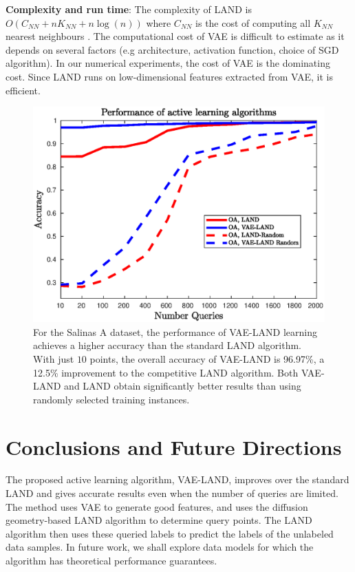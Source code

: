 \documentclass{article}
\begin{document}
\noindent \textbf{Complexity and run time}: The complexity of LAND is $O(C_{NN}+nK_{NN}+n\log(n))$ where $C_{NN}$ is the cost of computing all $K_{NN}$ nearest neighbours \cite{Maggioni2019_LAND}. 
The computational cost of VAE is difficult to estimate as it depends on several factors (e.g architecture, activation function, choice of SGD algorithm). In our numerical experiments, the cost of VAE is the dominating cost. Since LAND runs on low-dimensional features extracted from VAE, it is efficient. 

\begin{figure}
    \centering
    \includegraphics[width=.45\textwidth]{Images/salinasa_results_improved.eps}
    \caption{For the Salinas A dataset, the performance of VAE-LAND learning achieves a higher accuracy than the standard LAND algorithm. With just $10$ points, the overall accuracy of VAE-LAND is 96.97\%, a 12.5\% improvement to the competitive LAND algorithm. Both VAE-LAND and LAND obtain significantly better results than using randomly selected training instances. }
    \label{fig:my_label}
\end{figure}


\section{Conclusions and Future Directions}
\label{sec:Conclusions}
The proposed active learning algorithm, VAE-LAND, improves over the standard LAND and gives accurate results even when the number of queries are limited. The method uses VAE to generate good features, and uses the diffusion geometry-based LAND algorithm to determine query points. The LAND algorithm then uses these queried labels to predict the labels of the unlabeled data samples. In future work, we shall explore data models for which the algorithm has theoretical performance guarantees.   




\end{document}
